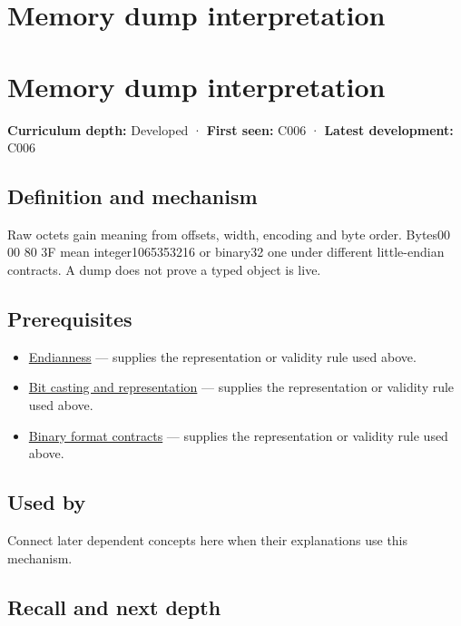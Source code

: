 \hypertarget{appendix-230b59c0676b}{}
\section*{Memory dump interpretation}
\section{Memory dump interpretation}\label{appendix-230b59c0676b-memory-dump-interpretation}

\textbf{Curriculum depth:} Developed · \textbf{First seen:} C006 · \textbf{Latest development:} C006

\subsection{Definition and mechanism}\label{appendix-230b59c0676b-definition-and-mechanism}

Raw octets gain meaning from offsets, width, encoding and byte order. Bytes00 00 80 3F mean integer1065353216 or binary32 one under different little-endian contracts. A dump does not prove a typed object is live.

\subsection{Prerequisites}\label{appendix-230b59c0676b-prerequisites}

\begin{itemize}
\tightlist
\item
  \hyperref[appendix-bc07c3d25b18]{Endianness} --- supplies the representation or validity rule used above.
\item
  \hyperref[appendix-34ee45f161c1]{Bit casting and representation} --- supplies the representation or validity rule used above.
\item
  \hyperref[appendix-590bbb2424c1]{Binary format contracts} --- supplies the representation or validity rule used above.
\end{itemize}

\subsection{Used by}\label{appendix-230b59c0676b-used-by}

Connect later dependent concepts here when their explanations use this mechanism.

\subsection{Recall and next depth}\label{appendix-230b59c0676b-recall-and-next-depth}

